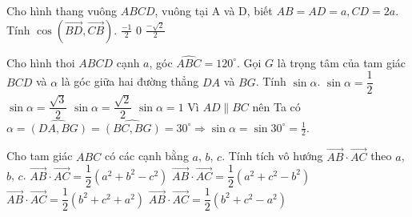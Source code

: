 \begin{ex}%
	Cho hình thang vuông $ABCD$, vuông tại A và D, biết $AB=AD=a, CD=2a$. Tính $\cos \left(\overrightarrow{BD},\overrightarrow{CB}\right)$.
	{$\displaystyle \frac{-1}{2}$}
	{\True$0$}
	{$\displaystyle \frac{-\sqrt{2}}{2}$}
\end{ex}

\begin{ex}%
	Cho hình thoi $ABCD$ cạnh $a$, góc $\widehat {ABC}=120^\circ $. Gọi $G$ là trọng tâm của tam giác $BCD$ và $\alpha $ là góc giữa hai đường thẳng $DA$ và $BG$. Tính $\sin \alpha $.
	\choice
	{\True $\sin \alpha =\dfrac {1}{2} $}
	{$\sin \alpha =\dfrac {\sqrt{3}}{2} $}
	{$\sin \alpha =\dfrac {\sqrt{2}}{2} $}
	{$\sin \alpha =1 $}
	\loigiai
	{Vì $AD\parallel BC$ nên Ta có
		$\alpha =\widehat {\left(DA,BG\right)}=\widehat {\left(BC,BG\right)}=30^\circ \Rightarrow \sin \alpha =\sin 30^\circ =\frac{1}{2}.$}
\end{ex}

\begin{ex}%
	Cho tam giác $ABC$ có các cạnh bằng $a$, $b$, $c$. Tính tích vô hướng $\overrightarrow{AB}\cdot \overrightarrow{AC}$ theo $a$, $b$, $c$.
	\choice
	{$\overrightarrow{AB}\cdot \overrightarrow{AC}=\dfrac{1}{2}(a^2+b^2-c^2)$}
	{$\overrightarrow{AB}\cdot \overrightarrow{AC}=\dfrac{1}{2}(a^2+c^2-b^2)$}
	{$\overrightarrow{AB}\cdot \overrightarrow{AC}=\dfrac{1}{2}(b^2+c^2+a^2)$}
	{\True $\overrightarrow{AB}\cdot \overrightarrow{AC}=\dfrac{1}{2}(b^2+c^2-a^2)$}
\end{ex}

